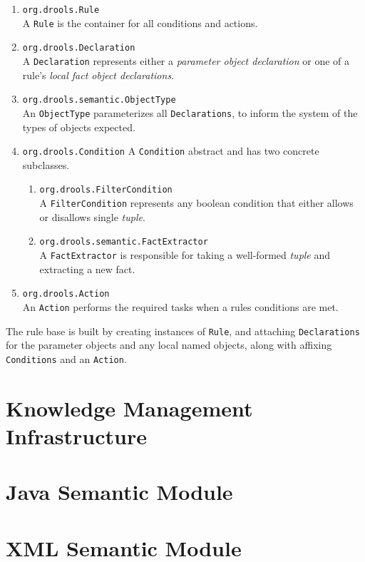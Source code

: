 \documentclass[10pt,twocolumn,letterpaper]{article}
\begin{document}
\begin{enumerate}
	\item \verb|org.drools.Rule|\\
		A \verb|Rule| is the container for all conditions and
		actions.
	\item \verb|org.drools.Declaration|\\
		A \verb|Declaration| represents either a
		\emph{parameter object declaration} or one of a
		rule's \emph{local fact object declarations}.
	\item \verb|org.drools.semantic.ObjectType|\\
		An \verb|ObjectType| parameterizes all \verb|Declarations|,
		to inform the system of the types of objects expected.
	\item \verb|org.drools.Condition|
		A \verb|Condition| abstract and has two concrete
		subclasses.
		\begin{enumerate}
			\item \verb|org.drools.FilterCondition|\\
			A \verb|FilterCondition| represents any boolean
			condition that either allows or disallows single
			\emph{tuple}.
			\item \verb|org.drools.semantic.FactExtractor|\\
			A \verb|FactExtractor| is responsible
			for taking a well-formed \emph{tuple} and 
			extracting a new fact.
		\end{enumerate}
	\item \verb|org.drools.Action|\\
		An \verb|Action| performs the required tasks when 
		a rules conditions are met.
\end{enumerate}

The rule base is built by creating instances of \verb|Rule|, 
and attaching \verb|Declarations| for the parameter objects and any
local named objects, along with affixing \verb|Conditions|
and an \verb|Action|.

\section{Knowledge Management\\Infrastructure}

\section{Java Semantic Module}

\section{XML Semantic Module}



\end{document}
